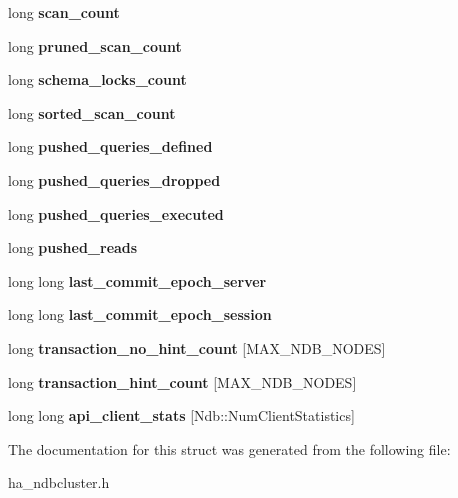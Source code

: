 \begin{DoxyCompactItemize}
long {\bfseries scan\+\_\+count}
\item 
\mbox{\label{structst__ndb__status_a428738f8b1043f1a9267d6af61191abf}} 
long {\bfseries pruned\+\_\+scan\+\_\+count}
\item 
\mbox{\label{structst__ndb__status_ad6d226ff57168b4e29fe7465936d7987}} 
long {\bfseries schema\+\_\+locks\+\_\+count}
\item 
\mbox{\label{structst__ndb__status_a4ea65ec29b5b47d9f9608aa8e26015de}} 
long {\bfseries sorted\+\_\+scan\+\_\+count}
\item 
\mbox{\label{structst__ndb__status_a6d29d7ed8f02c4512d2fa19008d71eab}} 
long {\bfseries pushed\+\_\+queries\+\_\+defined}
\item 
\mbox{\label{structst__ndb__status_a301495290120dead9b069636bec1a805}} 
long {\bfseries pushed\+\_\+queries\+\_\+dropped}
\item 
\mbox{\label{structst__ndb__status_a28686af5473f41ac807998fd4a402a35}} 
long {\bfseries pushed\+\_\+queries\+\_\+executed}
\item 
\mbox{\label{structst__ndb__status_ac880aa06beafc2f7f3026c71b530c367}} 
long {\bfseries pushed\+\_\+reads}
\item 
\mbox{\label{structst__ndb__status_af8aa0bf14c253c398f94b727b35f1cd7}} 
long long {\bfseries last\+\_\+commit\+\_\+epoch\+\_\+server}
\item 
\mbox{\label{structst__ndb__status_ac0afbd265f014e76935aaf4d755a9e75}} 
long long {\bfseries last\+\_\+commit\+\_\+epoch\+\_\+session}
\item 
\mbox{\label{structst__ndb__status_ad0d88fd00de844554c786b95d7bcef9e}} 
long {\bfseries transaction\+\_\+no\+\_\+hint\+\_\+count} \mbox{[}M\+A\+X\+\_\+\+N\+D\+B\+\_\+\+N\+O\+D\+ES\mbox{]}
\item 
\mbox{\label{structst__ndb__status_a98ce04a769bed3b2e4718d407107ade8}} 
long {\bfseries transaction\+\_\+hint\+\_\+count} \mbox{[}M\+A\+X\+\_\+\+N\+D\+B\+\_\+\+N\+O\+D\+ES\mbox{]}
\item 
\mbox{\label{structst__ndb__status_ae1be2c7583ba59ef7d837cf065a0efe8}} 
long long {\bfseries api\+\_\+client\+\_\+stats} \mbox{[}Ndb\+::\+Num\+Client\+Statistics\mbox{]}
\end{DoxyCompactItemize}


The documentation for this struct was generated from the following file\+:\begin{DoxyCompactItemize}
\item 
ha\+\_\+ndbcluster.\+h\end{DoxyCompactItemize}
